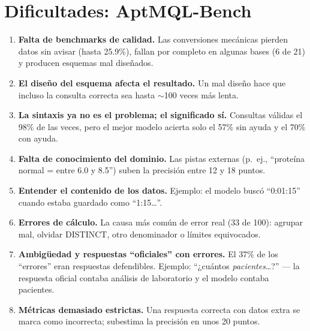 \documentclass[11pt,a4paper]{article}
\begin{document}
\section{Dificultades: AptMQL-Bench}
\begin{enumerate}
  \item \textbf{Falta de benchmarks de calidad.} Las conversiones mecánicas pierden datos sin avisar (hasta 25.9\%), fallan por completo en algunas bases (6 de 21) y producen esquemas mal diseñados.
  \item \textbf{El diseño del esquema afecta el resultado.} Un mal diseño hace que incluso la consulta correcta sea hasta $\sim$100 veces más lenta.
  \item \textbf{La sintaxis ya no es el problema; el significado sí.} Consultas válidas el 98\% de las veces, pero el mejor modelo acierta solo el 57\% sin ayuda y el 70\% con ayuda.
  \item \textbf{Falta de conocimiento del dominio.} Las pistas externas (p.\ ej., ``proteína normal = entre 6.0 y 8.5'') suben la precisión entre 12 y 18 puntos.
  \item \textbf{Entender el contenido de los datos.} Ejemplo: el modelo buscó ``0:01:15'' cuando estaba guardado como ``1:15\ldots''.
  \item \textbf{Errores de cálculo.} La causa más común de error real (33 de 100): agrupar mal, olvidar DISTINCT, otro denominador o límites equivocados.
  \item \textbf{Ambigüedad y respuestas ``oficiales'' con errores.} El 37\% de los ``errores'' eran respuestas defendibles. Ejemplo: ``¿cuántos \textit{pacientes}\ldots?'' --- la respuesta oficial contaba análisis de laboratorio y el modelo contaba pacientes.
  \item \textbf{Métricas demasiado estrictas.} Una respuesta correcta con datos extra se marca como incorrecta; subestima la precisión en unos 20 puntos.
\end{enumerate}

\end{document}
